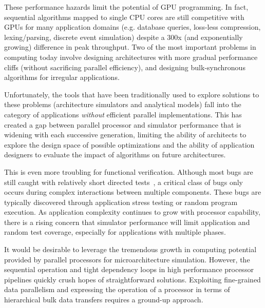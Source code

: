 \documentclass[conference, 10pt]{IEEEtran}
\begin{document}
These performance hazards limit the potential of GPU programming. In fact,
sequential algorithms mapped to single CPU cores are still competitive with GPUs
for many application domains (e.g. database queries, loss-less compression,
lexing/parsing, discrete event simulation) despite a 300x (and exponentially growing)
difference in peak throughput.  Two of the most important problems in computing
today involve designing architectures with more gradual performance cliffs
(without sacrificing parallel efficiency), and
designing bulk-synchronous algorithms for irregular applications.  

Unfortunately, the tools that have been traditionally used to explore solutions
to these problems (architecture simulators and analytical models) fall into the
category of applications \textit{without} efficient parallel implementations. 
This has created a gap between parallel processor and simulator performance that
is widening with each successive generation, limiting the ability of architects
to explore the design space of possible optimizations and the ability of
application designers to evaluate the impact of algorithms on future
architectures.  

This is even more troubling for functional verification.  Although most bugs are
still caught with relatively short directed tests~\cite{ref:bug-distributions},
a critical class of bugs only occurs during complex interactions between
multiple components.  These bugs are typically discovered through application
stress testing or random program execution.   As application complexity
continues to grow with processor capability, there is a rising concern that
simulator performance will limit application and random test coverage,
especially for applications with multiple phases.  

It would be desirable to leverage the tremendous growth in computing potential
provided by parallel processors for microarchitecture simulation.  However,
the sequential operation and tight dependency loops in high performance 
processor pipelines quickly crush hopes of straightforward solutions.
Exploiting fine-grained data parallelism and expressing the operation of a
processor in terms of hierarchical bulk data transfers requires a ground-up
approach.
\end{document}

